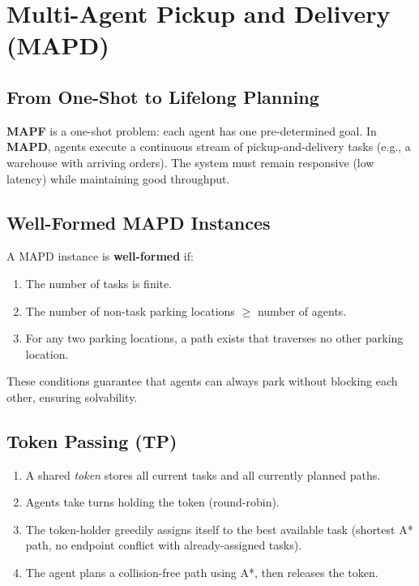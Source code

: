 \documentclass[11pt,a4paper]{article}
\theoremstyle{definition}
\theoremstyle{plain}
\theoremstyle{remark}
\begin{document}
\section{Multi-Agent Pickup and Delivery (MAPD)}

\subsection{From One-Shot to Lifelong Planning}

\textbf{MAPF} is a one-shot problem: each agent has one pre-determined goal. In \textbf{MAPD}, agents execute a continuous stream of pickup-and-delivery tasks (e.g., a warehouse with arriving orders). The system must remain responsive (low latency) while maintaining good throughput.

\subsection{Well-Formed MAPD Instances}

A MAPD instance is \textbf{well-formed} if:
\begin{enumerate}
    \item The number of tasks is finite.
    \item The number of non-task parking locations $\ge$ number of agents.
    \item For any two parking locations, a path exists that traverses no other parking location.
\end{enumerate}
These conditions guarantee that agents can always park without blocking each other, ensuring solvability.

\subsection{Token Passing (TP)}

\begin{tcolorbox}[colback=blue!5!white,colframe=blue!75!black,title=\textbf{Token Passing Algorithm}]
\begin{enumerate}
    \item A shared \emph{token} stores all current tasks and all currently planned paths.
    \item Agents take turns holding the token (round-robin).
    \item The token-holder greedily assigns itself to the best available task (shortest A* path, no endpoint conflict with already-assigned tasks).
    \item The agent plans a collision-free path using A*, then releases the token.
\end{enumerate}
\end{tcolorbox}
\end{document}
